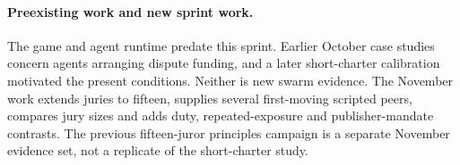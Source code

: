 \paragraph{Preexisting work and new sprint work.}
The game and agent runtime predate this sprint. Earlier October case studies
concern agents arranging dispute funding, and a later short-charter
calibration motivated the present conditions. Neither is new swarm evidence.
The November work
extends juries to fifteen, supplies several first-moving scripted peers,
compares jury sizes and adds duty, repeated-exposure and publisher-mandate
contrasts. The previous fifteen-juror principles campaign is a separate
November evidence set, not a replicate of the short-charter study.
